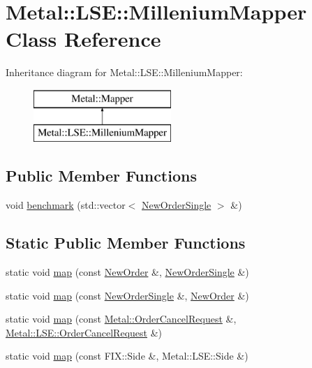\hypertarget{classMetal_1_1LSE_1_1MilleniumMapper}{}\section{Metal\+:\+:L\+S\+E\+:\+:Millenium\+Mapper Class Reference}
\label{classMetal_1_1LSE_1_1MilleniumMapper}
Inheritance diagram for Metal\+:\+:L\+S\+E\+:\+:Millenium\+Mapper\+:\begin{figure}[H]
\begin{center}
\leavevmode
\includegraphics[height=2.000000cm]{classMetal_1_1LSE_1_1MilleniumMapper}
\end{center}
\end{figure}
\subsection*{Public Member Functions}
\begin{DoxyCompactItemize}
\item 
void \hyperlink{classMetal_1_1LSE_1_1MilleniumMapper_a63d9848ac2d8eb7c5e76e50c2d365c79}{benchmark} (std\+::vector$<$ \hyperlink{classMetal_1_1NewOrderSingle}{New\+Order\+Single} $>$ \&)
\end{DoxyCompactItemize}
\subsection*{Static Public Member Functions}
\begin{DoxyCompactItemize}
\item 
static void \hyperlink{classMetal_1_1LSE_1_1MilleniumMapper_a08f65c6357d8b450aff6335bf7dd4de8}{map} (const \hyperlink{classMetal_1_1LSE_1_1NewOrder}{New\+Order} \&, \hyperlink{classMetal_1_1NewOrderSingle}{New\+Order\+Single} \&)
\item 
static void \hyperlink{classMetal_1_1LSE_1_1MilleniumMapper_a83374c3bae042cd654f5f8b64d0584a2}{map} (const \hyperlink{classMetal_1_1NewOrderSingle}{New\+Order\+Single} \&, \hyperlink{classMetal_1_1LSE_1_1NewOrder}{New\+Order} \&)
\item 
static void \hyperlink{classMetal_1_1LSE_1_1MilleniumMapper_a21b4c1861b7c394ecae250baa685ab6d}{map} (const \hyperlink{classMetal_1_1OrderCancelRequest}{Metal\+::\+Order\+Cancel\+Request} \&, \hyperlink{classMetal_1_1LSE_1_1OrderCancelRequest}{Metal\+::\+L\+S\+E\+::\+Order\+Cancel\+Request} \&)
\item 
static void \hyperlink{classMetal_1_1LSE_1_1MilleniumMapper_a430f2f1f1f8dc53821e39ab90f6c78df}{map} (const F\+I\+X\+::\+Side \&, Metal\+::\+L\+S\+E\+::\+Side \&)
\end{DoxyCompactItemize}


